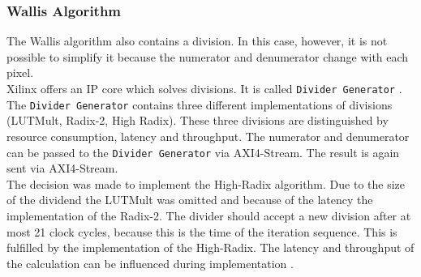 \subsubsection*{Wallis Algorithm}
The Wallis algorithm also contains a division. In this case, however, it is not
possible to simplify it
because the numerator and denumerator change with each pixel. \\
Xilinx offers an IP core which solves divisions. It is called \texttt{Divider
Generator} \cite{divider}. The \texttt{Divider Generator} contains three different implementations of divisions (LUTMult, Radix-2, High Radix). These three divisions are distinguished by resource consumption, latency and throughput. The numerator and denumerator can be passed to the \texttt{Divider Generator} via AXI4-Stream. The result is again sent via AXI4-Stream. \\
The decision was made to implement the High-Radix algorithm. Due to the size of
the dividend the LUTMult was omitted and because of the latency the implementation of the Radix-2. The divider should accept a new division after at most 21 clock cycles, because this is the time of the iteration sequence. This is fulfilled by the implementation of the High-Radix. The latency and throughput of the calculation can be influenced during implementation \cite{divider}.

